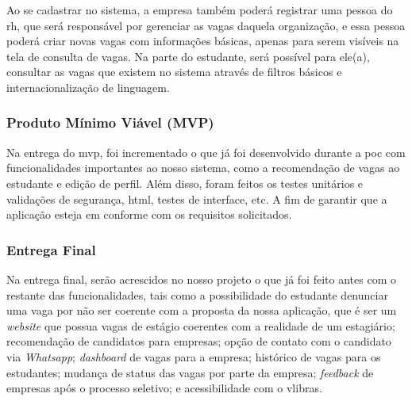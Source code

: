 Ao se cadastrar no sistema, a empresa também poderá registrar uma pessoa do \ac{rh}, que será responsável por gerenciar as vagas daquela organização, e essa pessoa poderá criar novas vagas com informações básicas, apenas para serem visíveis na tela de consulta de vagas. Na parte do estudante, será possível para ele(a), consultar as vagas que existem no sistema através de filtros básicos e internacionalização de linguagem.

\subsubsection{Produto Mínimo Viável (MVP)}

Na entrega do \ac{mvp}, foi incrementado o que já foi desenvolvido durante a \ac{poc} com funcionalidades importantes ao nosso sistema, como a recomendação de vagas ao estudante e edição de perfil. Além disso, foram feitos os testes unitários e validações de segurança, \ac{html}, testes de interface, etc. A fim de garantir que a aplicação esteja em conforme com os requisitos solicitados.

\subsubsection{Entrega Final}

Na entrega final, serão acrescidos no nosso projeto o que já foi feito antes com o restante das funcionalidades, tais como a possibilidade do estudante denunciar uma vaga por não ser coerente com a proposta da nossa aplicação, que é ser um \emph{website} que possua vagas de estágio coerentes com a realidade de um estagiário; recomendação de candidatos para empresas; opção de contato com o candidato via \emph{Whatsapp}; \emph{dashboard} de vagas para a empresa; histórico de vagas para os estudantes; mudança de status das vagas por parte da empresa; \emph{feedback} de empresas após o processo seletivo; e acessibilidade com o \gls{vlibras}.